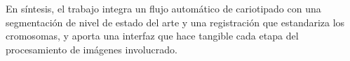 \documentclass[11pt,a4paper]{article}
\begin{document}
En síntesis, el trabajo integra un flujo automático de cariotipado con una
segmentación de nivel de estado del arte y una registración que estandariza los
cromosomas, y aporta una interfaz que hace tangible cada etapa del procesamiento de
imágenes involucrado.



\end{document}
